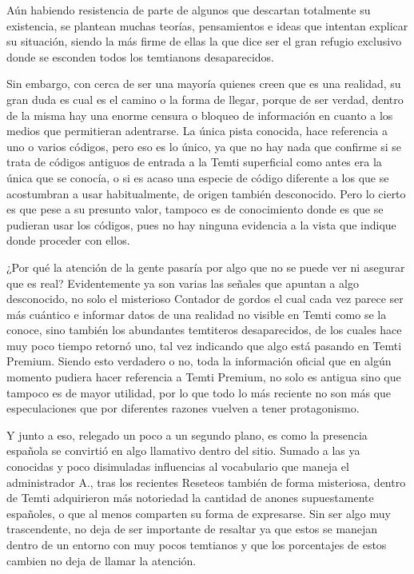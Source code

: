 \documentclass[
  spanish,
]{book}
\begin{document}
Aún habiendo resistencia de parte de algunos que descartan totalmente su existencia, se plantean muchas teorías, pensamientos e ideas que intentan explicar su situación, siendo la más firme de ellas la que dice ser el gran refugio exclusivo donde se esconden todos los temtianons desaparecidos.

Sin embargo, con cerca de ser una mayoría quienes creen que es una realidad, su gran duda es cual es el camino o la forma de llegar, porque de ser verdad, dentro de la misma hay una enorme censura o bloqueo de información en cuanto a los medios que permitieran adentrarse. La única pista conocida, hace referencia a uno o varios códigos, pero eso es lo único, ya que no hay nada que confirme si se trata de códigos antiguos de entrada a la Temti superficial como antes era la única que se conocía, o si es acaso una especie de código diferente a los que se acostumbran a usar habitualmente, de origen también desconocido. Pero lo cierto es que pese a su presunto valor, tampoco es de conocimiento donde es que se pudieran usar los códigos, pues no hay ninguna evidencia a la vista que indique donde proceder con ellos.

¿Por qué la atención de la gente pasaría por algo que no se puede ver ni asegurar que es real? Evidentemente ya son varias las señales que apuntan a algo desconocido, no solo el misterioso Contador de gordos el cual cada vez parece ser más cuántico e informar datos de una realidad no visible en Temti como se la conoce, sino también los abundantes temtiteros desaparecidos, de los cuales hace muy poco tiempo retornó uno, tal vez indicando que algo está pasando en Temti Premium. Siendo esto verdadero o no, toda la información oficial que en algún momento pudiera hacer referencia a Temti Premium, no solo es antigua sino que tampoco es de mayor utilidad, por lo que todo lo más reciente no son más que especulaciones que por diferentes razones vuelven a tener protagonismo.

Y junto a eso, relegado un poco a un segundo plano, es como la presencia española se convirtió en algo llamativo dentro del sitio. Sumado a las ya conocidas y poco disimuladas influencias al vocabulario que maneja el administrador A., tras los recientes Reseteos también de forma misteriosa, dentro de Temti adquirieron más notoriedad la cantidad de anones supuestamente españoles, o que al menos comparten su forma de expresarse. Sin ser algo muy trascendente, no deja de ser importante de resaltar ya que estos se manejan dentro de un entorno con muy pocos temtianos y que los porcentajes de estos cambien no deja de llamar la atención.
\end{document}
